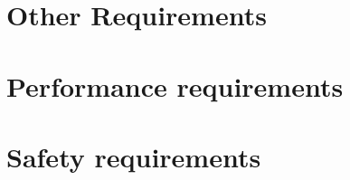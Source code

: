 \documentclass[10pt]{article}
\begin{document}
\lipsum[10]



\section{Other Requirements}

\begin{appendices}

	\section{Performance requirements}

	\lipsum[10]

	\section{Safety requirements}

	\lipsum[10]

\end{appendices}
\end{document}
